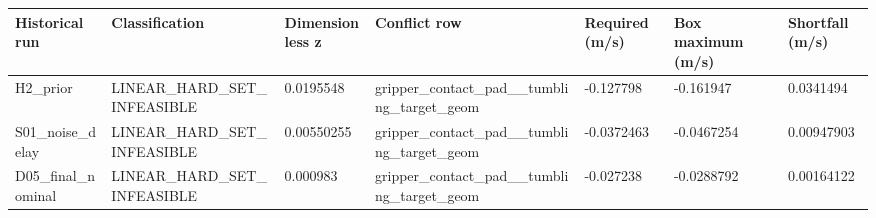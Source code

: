 \begin{tabular}{lllllll}
\hline
Historical run & Classification & Dimensionless z & Conflict row & Required (m/s) & Box maximum (m/s) & Shortfall (m/s) \\
\hline
H2\_prior & LINEAR\_HARD\_SET\_INFEASIBLE & 0.0195548 & gripper\_contact\_pad\_\_tumbling\_target\_geom & -0.127798 & -0.161947 & 0.0341494 \\
S01\_noise\_delay & LINEAR\_HARD\_SET\_INFEASIBLE & 0.00550255 & gripper\_contact\_pad\_\_tumbling\_target\_geom & -0.0372463 & -0.0467254 & 0.00947903 \\
D05\_final\_nominal & LINEAR\_HARD\_SET\_INFEASIBLE & 0.000983 & gripper\_contact\_pad\_\_tumbling\_target\_geom & -0.027238 & -0.0288792 & 0.00164122 \\
\hline
\end{tabular}
